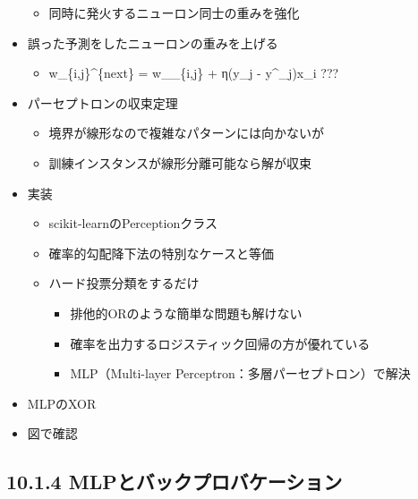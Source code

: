\begin{itemize}
  \begin{itemize}
  \tightlist
  \item
    同時に発火するニューロン同士の重みを強化
  \end{itemize}
\item
  誤った予測をしたニューロンの重みを上げる

  \begin{itemize}
  \tightlist
  \item
    w\_\{i,j\}\^{}\{next\} = w\_\_\{i,j\} + η(y\_j - y\^{}\_j)x\_i ???
  \end{itemize}
\item
  パーセプトロンの収束定理

  \begin{itemize}
  \tightlist
  \item
    境界が線形なので複雑なパターンには向かないが
  \item
    訓練インスタンスが線形分離可能なら解が収束
  \end{itemize}
\item
  実装

  \begin{itemize}
  \tightlist
  \item
    scikit-learnのPerceptionクラス
  \item
    確率的勾配降下法の特別なケースと等価
  \item
    ハード投票分類をするだけ

    \begin{itemize}
    \tightlist
    \item
      排他的ORのような簡単な問題も解けない
    \item
      確率を出力するロジスティック回帰の方が優れている
    \item
      MLP（Multi-layer Perceptron：多層パーセプトロン）で解決
    \end{itemize}
  \end{itemize}
\item
  MLPのXOR
\item
  図で確認
\end{itemize}

\hypertarget{mlpux3068ux30d0ux30c3ux30afux30d7ux30edux30d0ux30b1ux30fcux30b7ux30e7ux30f3}{%
\subsection{10.1.4
MLPとバックプロバケーション}\label{mlpux3068ux30d0ux30c3ux30afux30d7ux30edux30d0ux30b1ux30fcux30b7ux30e7ux30f3}}


